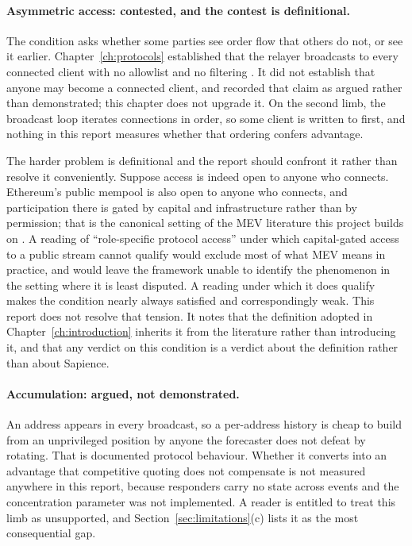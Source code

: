 \paragraph{Asymmetric access: contested, and the contest is definitional.} The condition asks
whether some parties see order flow that others do not, or see it earlier.
Chapter~\ref{ch:protocols} established that the relayer broadcasts to every connected client
with no allowlist and no filtering \cite{sapience2026relayer,sapience2026builderguide}. It
did not establish that anyone may become a connected client, and recorded that claim as
argued rather than demonstrated; this chapter does not upgrade it. On the second limb, the
broadcast loop iterates connections in order, so some client is written to first, and
nothing in this report measures whether that ordering confers advantage.

The harder problem is definitional and the report should confront it rather than resolve it
conveniently. Suppose access is indeed open to anyone who connects. Ethereum's public
mempool is also open to anyone who connects, and participation there is gated by capital and
infrastructure rather than by permission; that is the canonical setting of the MEV
literature this project builds on \cite{daian2019flashboys,ethereummev}. A reading of
``role-specific protocol access'' under which capital-gated access to a public stream cannot
qualify would exclude most of what MEV means in practice, and would leave the framework
unable to identify the phenomenon in the setting where it is least disputed. A reading under
which it does qualify makes the condition nearly always satisfied and correspondingly weak.
This report does not resolve that tension. It notes that the definition adopted in
Chapter~\ref{ch:introduction} inherits it from the literature rather than introducing it,
and that any verdict on this condition is a verdict about the definition rather than about
Sapience.

\paragraph{Accumulation: argued, not demonstrated.} An address appears in every broadcast,
so a per-address history is cheap to build from an unprivileged position by anyone the
forecaster does not defeat by rotating. That
is documented protocol behaviour. Whether it converts into an advantage that competitive
quoting does not compensate is not measured anywhere in this report, because responders
carry no state across events and the concentration parameter was not implemented. A reader
is entitled to treat this limb as unsupported, and Section~\ref{sec:limitations}(c) lists it
as the most consequential gap.

